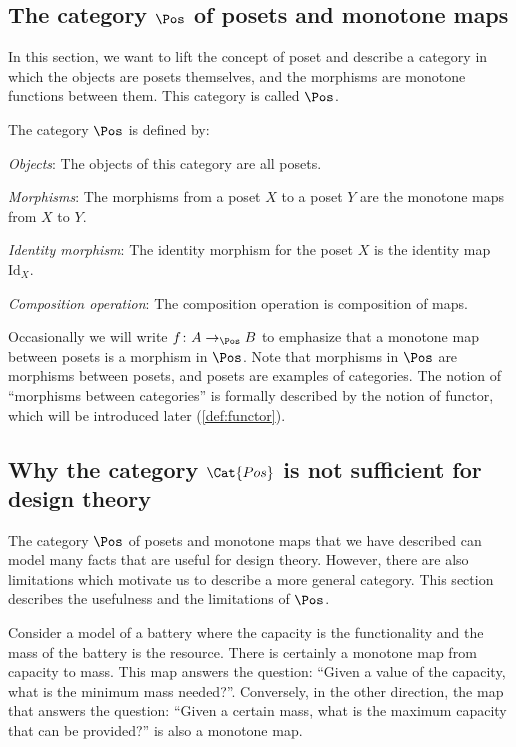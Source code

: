 \subsection{The category $\Pos$ of posets and monotone maps}
In this section, we want to lift the concept of poset and describe a category in which the objects are posets themselves, and the morphisms are monotone functions between them. This category is called $\Pos$.

\begin{definition}
    The category $\Pos$ is defined by:
    \begin{compactenum}
    \item \emph{Objects}: The objects of this category are all posets.
    \item \emph{Morphisms}: The morphisms from a poset $X$ to a poset $Y$ are the monotone maps from $X$ to $Y$.
    \item \emph{Identity morphism}:  The identity morphism for the poset $X$
    is the identity map $\text{Id}_X$.
    \item \emph{Composition operation}: The composition operation is composition of maps.
    \end{compactenum}
\end{definition}

Occasionally we will write $f \colon A \to_{\Pos} B$ to emphasize that a monotone map between posets is a morphism in $\Pos$. Note that morphisms in $\Pos$ are morphisms between posets, and posets are examples of categories. The notion of ``morphisms between categories'' is formally described by the notion of functor, which will be introduced later (\cref{def:functor}).


\subsection{Why the category $\Cat{Pos}$ is not sufficient for design theory}


The category $\Pos$ of posets and monotone maps that we have described can model many facts that are useful for design theory. However, there are also limitations which motivate us to describe a more general category. This section describes the usefulness and the limitations of $\Pos$.

\begin{example}[Battery]
Consider a model of a battery where the capacity is the functionality and the mass of the battery is the resource.
There is certainly a monotone map from capacity to mass. This map answers the question: ``Given a value of the capacity, what is the minimum mass needed?''. Conversely, in the other direction, the map that answers the question: ``Given a certain mass, what is the maximum capacity that can be provided?'' is also a monotone map.
\end{example}


